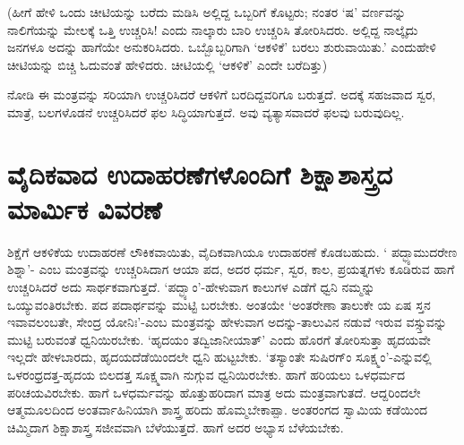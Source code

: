 (ಹೀಗೆ ಹೇಳಿ ಒಂದು ಚೀಟಿಯನ್ನು ಬರೆದು ಮಡಿಸಿ ಅಲ್ಲಿದ್ದ ಒಬ್ಬರಿಗೆ ಕೊಟ್ಟರು; ನಂತರ `ಷ' ವರ್ಣವನ್ನು ನಾಲಿಗೆಯನ್ನು ಮೇಲಕ್ಕೆ  ಒತ್ತಿ ಉಚ್ಚರಿಸಿ! ಎಂದು ನಾಲ್ಕಾರು ಬಾರಿ ಉಚ್ಚರಿಸಿ ತೋರಿಸಿದರು. ಅಲ್ಲಿದ್ದ ನಾಲ್ಕೈದು ಜನಗಳೂ ಅದನ್ನು ಹಾಗೆಯೇ ಅನುಕರಿಸಿದರು. ಒಬ್ಬೊಬ್ಬರಿಗಾಗಿ `ಆಕಳಿಕೆ' ಬರಲು ಶುರುವಾಯಿತು.' ಎಂದುಹೇಳಿ ಚೀಟಿಯನ್ನು ಬಿಚ್ಚಿ ಓದುವಂತೆ ಹೇಳಿದರು. ಚೀಟಿಯಲ್ಲಿ `ಆಕಳಿಕೆ' ಎಂದೇ ಬರೆದಿತ್ತು)

ನೋಡಿ ಈ ಮಂತ್ರವನ್ನು ಸರಿಯಾಗಿ ಉಚ್ಚರಿಸಿದರೆ ಆಕಳಿಗೆ ಬರದಿದ್ದವರಿಗೂ ಬರುತ್ತದೆ. ಅದಕ್ಕೆ ಸಹಜವಾದ ಸ್ವರ, ಮಾತ್ರೆ, ಬಲಗಳೊಡನೆ ಉಚ್ಚರಿಸಿದರೆ ಫಲ ಸಿದ್ಧಿಯಾಗುತ್ತದೆ. ಅವು ವ್ಯತ್ಯಾಸವಾದರೆ ಫಲವು ಬರುವುದಿಲ್ಲ.

\section*{ವೈದಿಕವಾದ ಉದಾಹರಣೆಗಳೊಂದಿಗೆ ಶಿಕ್ಷಾಶಾಸ್ತ್ರದ ಮಾರ್ಮಿಕ ವಿವರಣೆ}

ಶಿಕ್ಷೆಗೆ ಆಕಳಿಕೆಯ ಉದಾಹರಣೆ ಲೌಕಿಕವಾಯಿತು, ವೈದಿಕವಾಗಿಯೂ ಉದಾಹರಣೆ ಕೊಡಬಹುದು. ` ಪದ್ಭ್ಯಾಮುದರೇಣ ಶಿಶ್ನಾ'-\label{26} ಎಂಬ ಮಂತ್ರವನ್ನು ಉಚ್ಚರಿಸಿದಾಗ ಆಯಾ ಪದ, ಅದರ ಧರ್ಮ, ಸ್ವರ, ಕಾಲ, ಪ್ರಯತ್ನಗಳು ಕೂಡಿರುವ ಹಾಗೆ ಉಚ್ಚರಿಸಿದರೆ ಅದು ಸಾರ್ಥಕವಾಗುತ್ತದೆ. `ಪದ್ಭ್ಯಾಂ'-ಹೇಳುವಾಗ ಕಾಲುಗಳ ಎಡೆಗೆ ಧ್ವನಿ ನಮ್ಮನ್ನು ಒಯ್ಯುವಂತಿರಬೇಕು. ಪದ ಪದಾರ್ಥವನ್ನು ಮುಟ್ಟಿ ಬರಬೇಕು. ಅಂತಯೇ `ಅಂತರೇಣಾ ತಾಲುಕೇ ಯ ಏಷ ಸ್ತನ ಇವಾವಲಂಬತೇ, ಸೇಂದ್ರ ಯೋನಿಃ'-ಎಂಬ ಮಂತ್ರವನ್ನು ಹೇಳುವಾಗ ಅದನ್ನು-ತಾಲುವಿನ ನಡುವೆ ಇರುವ ವಸ್ಸ್ತುವನ್ನು ಮುಟ್ಟಿ ಬರುವಂತೆ ಧ್ವನಿಯಿರಬೇಕು. `ಹೃದಯಂ ತದ್ವಿಜಾನೀಯಾತ್'\label{27a} ಎಂದು ಹೊರಗೆ ತೋರಿಸುತ್ತಾ ಹೃದಯವೇ ಇಲ್ಲದೇ ಹೇಳಬಾರದು, ಹೃದಯದೆಡೆಯಿಂದಲೇ ಧ್ವನಿ ಹುಟ್ಟಬೇಕು. `ತಸ್ಯಾಂತೇ ಸುಷಿರಗ್ಂ ಸೂಕ್ಷ್ಮಂ'-ಎನ್ನುವಲ್ಲಿ\label{27} ಒಳರಂಧ್ರದತ್ತ-ಹೃದಯ ಬಿಲದತ್ತ ಸೂಕ್ಷ್ಮವಾಗಿ ನುಗ್ಗುವ ಧ್ವನಿಯಿರಬೇಕು. ಹಾಗೆ ಹರಿಯಲು ಒಳಧರ್ಮದ ಪರಿಚಯವಿರಬೇಕು. ಹಾಗೆ ಒಳಧರ್ಮವನ್ನು ಹೊತ್ತುಹರಿದಾಗ ಮಾತ್ರ ಅದು ಮಂತ್ರವಾಗುತದೆ. ಆದ್ದರಿಂದಲೇ ಆತ್ಮಮೂಲದಿಂದ ಅಂತರ್ವಾಹಿನಿಯಾಗಿ ಶಾಸ್ತ್ರ ಹರಿದು ಹೊಮ್ಮಬೇಕಾಪ್ಪಾ. ಅಂತರಂಗದ ಸ್ವಾಮಿಯ ಕಡೆಯಿಂದ ಚಿಮ್ಮಿದಾಗ ಶಿಕ್ಷಾಶಾಸ್ತ್ರ ಸಜೀವವಾಗಿ ಬೆಳೆಯುತ್ತದೆ. ಹಾಗೆ ಅದರ ಅಭ್ಯಾಸ ಬೆಳೆಯಬೇಕು.



